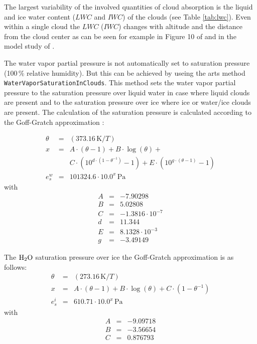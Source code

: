 {The largest variability of the involved quantities of cloud absorption
is the liquid and ice water content ($LWC$ and $IWC$) of the clouds 
(see Table \ref{tab:lwc}). Even within a single cloud the $LWC$ ($IWC$) changes
with altitude and the distance from the cloud center as can be seen for
example in Figure 10 of \citet{ludlammason:57} and in the model study
of \citet{costaetal:00}.




\label{levelb:WV_sat_in_cloud}

The water vapor partial pressure is not automatically set to 
saturation pressure (100\,\% relative humidity). But this can 
be achieved by useing the arts method 
{\tt WaterVaporSaturationInClouds{}}.
This method sets the water vapor partial pressure to the 
saturation pressure over liquid water in case where liquid clouds 
are present and to the saturation pressure over ice where 
ice or water/ice clouds are present. The calculation of the 
saturation pressure is calculated according to the 
Goff-Gratch approximation \citep{liebeetal:93}:

\begin{eqnarray}
  \theta &=& (373.16\,\mbox{K} / T) \\
%
  x      &=& A \cdot \left(\theta -1 \right) + 
             B \cdot \log{(\theta)} + \nonumber\\ 
         &&  C \cdot \left( 10^{d\cdot (1- \theta^{-1})} -1 \right) +  
             E \cdot \left( 10^{g\cdot (\theta-1)} -1 \right) \\ 
%
  e^w_s  &=& 101324.6 \cdot 10.0^x\,\mbox{Pa} 
\end{eqnarray}
with
\begin{eqnarray}
 A &=& -7.90298 \nonumber \\
 B &=& 5.02808  \nonumber \\
 C &=& -1.3816 \cdot 10^{-7} \nonumber \\
 d &=& 11.344 \nonumber \\
 E &=& 8.1328 \cdot 10^{-3} \nonumber \\
 g &=& -3.49149 \nonumber
\end{eqnarray}


The $\mbox{H}_2\mbox{O}$ saturation pressure over ice the Goff-Gratch 
approximation \citep{liebeetal:93} is as follows:
\begin{eqnarray}
  \theta &=& (273.16\,\mbox{K} / T) \\
%
  x      &=& A \cdot \left(\theta -1 \right) + 
             B \cdot \log{(\theta)} + 
             C \cdot \left( 1- \theta^{-1} \right) \\ 
%
  e^i_s  &=& 610.71 \cdot 10.0^x\,\mbox{Pa} 
\end{eqnarray}
with
\begin{eqnarray}
 A &=& -9.09718  \nonumber \\
 B &=& -3.56654  \nonumber \\
 C &=&  0.876793 \nonumber
\end{eqnarray}



}
